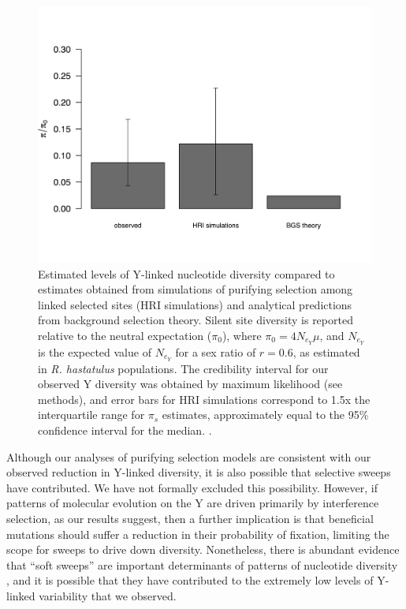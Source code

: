 \documentclass[9pt,twocolumn,twoside]{gsajnl}
\begin{document}
\begin{figure}[t!]
\centering
\noindent
\includegraphics[width=\linewidth]{figure4.jpg}
\caption{Estimated levels of Y-linked nucleotide diversity compared to estimates obtained from simulations of purifying selection among linked selected sites (HRI simulations) and analytical predictions from background selection theory. Silent site diversity is reported relative to the neutral expectation ($\pi_{0}$), where $\pi_{0} =4N_{e}_{Y}\mu$, and $N_{e}_{Y}$ is the expected value of $N_{e}_{Y}$ for a sex ratio of $r=0.6$, as estimated in \textit{R. hastatulus} populations. The credibility interval for our observed Y diversity was obtained by maximum likelihood (see methods), and error bars for HRI simulations correspond to 1.5x the interquartile range for $\pi_{s}$ estimates, approximately equal to the 95\% confidence interval for the median. \citep{chambers1983graphical}.
}
\label{fig:ydiversity}
\end{figure}

Although our analyses of purifying selection models are consistent with our observed reduction in Y-linked diversity, it is also possible that selective sweeps have contributed. We have not formally excluded this possibility. However, if patterns of molecular evolution on the Y are driven primarily by interference selection, as our results suggest, then a further implication is that beneficial mutations should suffer a reduction in their probability of fixation, limiting the scope for sweeps to drive down diversity. Nonetheless, there is abundant evidence that “soft sweeps” are important determinants of patterns of nucleotide diversity \citep{messer2013population}, and it is possible that they have contributed to the extremely low levels of Y-linked variability that we observed.
\end{document}
